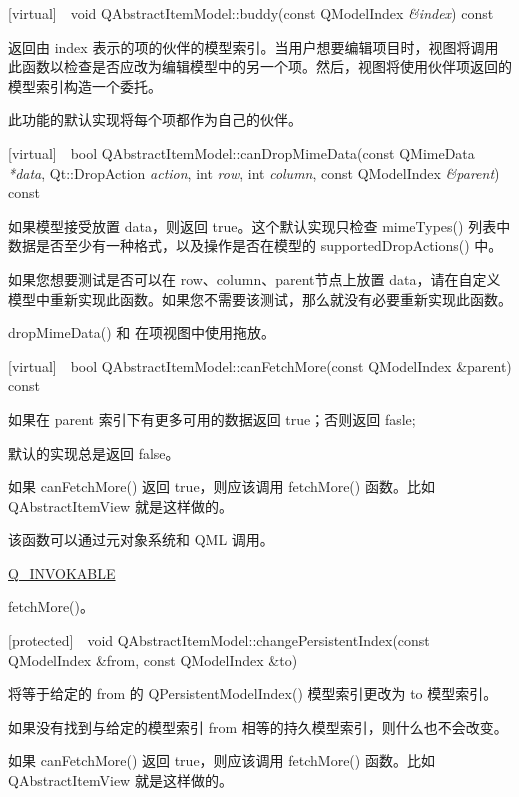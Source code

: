 [virtual] void QAbstractItemModel::buddy(const QModelIndex \emph{\&index}) const

返回由 index 表示的项的伙伴的模型索引。当用户想要编辑项目时，视图将调用此函数以检查是否应改为编辑模型中的另一个项。然后，视图将使用伙伴项返回的模型索引构造一个委托。

此功能的默认实现将每个项都作为自己的伙伴。

[virtual] bool QAbstractItemModel::canDropMimeData(const QMimeData \emph{*data}, Qt::DropAction \emph{action}, int \emph{row}, int \emph{column}, const QModelIndex \emph{\&parent}) const

如果模型接受放置 data，则返回 true。这个默认实现只检查 mimeTypes() 列表中数据是否至少有一种格式，以及操作是否在模型的 supportedDropActions() 中。

如果您想要测试是否可以在 row、column、parent节点上放置 data，请在自定义模型中重新实现此函数。如果您不需要该测试，那么就没有必要重新实现此函数。

\begin{seeAlso}
dropMimeData() 和 在项视图中使用拖放。
\end{seeAlso}


[virtual] bool QAbstractItemModel::canFetchMore(const QModelIndex \&parent) const

如果在 parent 索引下有更多可用的数据返回 true；否则返回 fasle;

默认的实现总是返回 false。

如果 canFetchMore() 返回 true，则应该调用 fetchMore() 函数。比如 QAbstractItemView 就是这样做的。

\begin{notice}
该函数可以通过元对象系统和 QML 调用。
\end{notice}

\begin{seeAlso}
\href{}{Q\_INVOKABLE}
\end{seeAlso}

\begin{seeAlso}
fetchMore()。
\end{seeAlso}

[protected] void QAbstractItemModel::changePersistentIndex(const QModelIndex \&from, const QModelIndex \&to)

将等于给定的 from 的 QPersistentModelIndex() 模型索引更改为 to 模型索引。

如果没有找到与给定的模型索引 from 相等的持久模型索引，则什么也不会改变。

如果 canFetchMore() 返回 true，则应该调用 fetchMore() 函数。比如 QAbstractItemView 就是这样做的。


